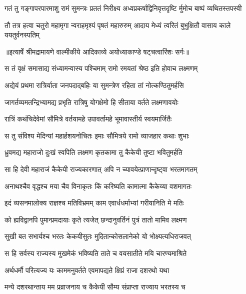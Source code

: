 \fourlineindentedshloka
{गतं तु गङ्गापरपारमाशु}
{ रामं सुमन्त्रः प्रततं निरीक्ष्य}
{अध्वप्रकर्षाद्विनिवृत्तदृष्टि}
{र्मुमोच बाष्पं व्यथितस्तपस्वी} %

\fourlineindentedshloka
{तौ तत्र हत्वा चतुरो महामृगा}
{न्वराहमृश्यं पृषतं महारुरुम्}
{आदाय मेध्यं त्वरितं बुभुक्षितौ}
{ वासाय काले ययतुर्वनस्पतिम्} %


{॥इत्यार्षे श्रीमद्रामायणे वाल्मीकीये आदिकाव्ये अयोध्याकाण्डे षट्चत्वारिंशः सर्गः॥}


\twolineshloka
{स तं वृक्षं समासाद्य संध्यामन्वास्य पश्चिमाम्}
{रामो रमयतां श्रेष्ठ इति होवाच लक्ष्मणम्} %

\twolineshloka
{अद्येयं प्रथमा रात्रिर्याता जनपदाद्बहिः}
{या सुमन्त्रेण रहिता तां नोत्कण्ठितुमर्हसि} %

\twolineshloka
{जागर्तव्यमतन्द्रिभ्यामद्य प्रभृति रात्रिषु}
{योगक्षेमो हि सीताया वर्तते लक्ष्मणावयोः} %

\twolineshloka
{रात्रिं कथंचिदेवेमां सौमित्रे वर्तयामहे}
{उपावर्तामहे भूमावास्तीर्य स्वयमार्जितैः} %

\twolineshloka
{स तु संविश्य मेदिन्यां महार्हशयनोचितः}
{इमाः सौमित्रये रामो व्याजहार कथाः शुभाः} %

\twolineshloka
{ध्रुवमद्य महाराजो दुःखं स्वपिति लक्ष्मण}
{कृतकामा तु कैकेयी तुष्टा भवितुमर्हति} %

\twolineshloka
{सा हि देवी महाराजं कैकेयी राज्यकारणात्}
{अपि न च्यावयेत्प्राणान्दृष्ट्वा भरतमागतम्} %

\twolineshloka
{अनाथश्चैव वृद्धश्च मया चैव विनाकृतः}
{किं करिष्यति कामात्मा कैकेय्या वशमागतः} %

\twolineshloka
{इदं व्यसनमालोक्य राज्ञश्च मतिविभ्रमम्}
{काम एवार्धधर्माभ्यां गरीयानिति मे मतिः} %

\twolineshloka
{को ह्यविद्वानपि पुमान्प्रमदायाः कृते त्यजेत्}
{छन्दानुवर्तिनं पुत्रं तातो मामिव लक्ष्मण} %

\twolineshloka
{सुखी बत सभार्यश्च भरतः केकयीसुतः}
{मुदितान्कोसलानेको यो भोक्ष्यत्यधिराजवत्} %

\twolineshloka
{स हि सर्वस्य राज्यस्य मुखमेकं भविष्यति}
{ताते च वयसातीते मयि चारण्यमाश्रिते} %

\twolineshloka
{अर्थधर्मौ परित्यज्य यः काममनुवर्तते}
{एवमापद्यते क्षिप्रं राजा दशरथो यथा} %

\twolineshloka
{मन्ये दशरथान्ताय मम प्रव्राजनाय च}
{कैकेयी सौम्य संप्राप्ता राज्याय भरतस्य च} %

